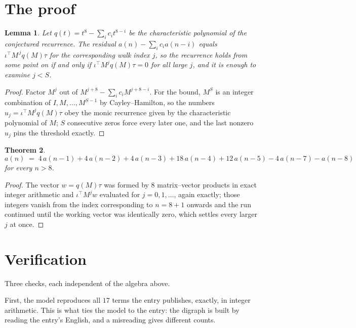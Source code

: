 \documentclass[11pt,a4paper]{article}
\theoremstyle{plain}
\newtheorem{theorem}{Theorem}
\newtheorem{lemma}[theorem]{Lemma}
\theoremstyle{definition}
\begin{document}
\section{The proof}

\begin{lemma}\label{lem:crit}
Let $q(t)=t^{8}-\sum_i c_it^{8-i}$ be the characteristic polynomial of the
conjectured recurrence. The residual $a(n)-\sum_ic_ia(n-i)$ equals
$\iota^{\!\top}M^{\,j}q(M)\tau$ for the corresponding walk index $j$, so the recurrence
holds from some point on if and only if $\iota^{\!\top}M^{j}q(M)\tau=0$ for all large $j$,
and it is enough to examine $j<S$.
\end{lemma}

\begin{proof}
Factor $M^{j}$ out of $M^{j+8}-\sum_ic_iM^{j+8-i}$. For the bound, $M^{S}$
is an integer combination of $I,M,\dots,M^{S-1}$ by Cayley--Hamilton, so the numbers
$u_j=\iota^{\!\top}M^{j}q(M)\tau$ obey the monic recurrence given by the characteristic
polynomial of $M$; $S$ consecutive zeros force every later one, and the last nonzero $u_j$
pins the threshold exactly.
\end{proof}

\begin{theorem}
\[
a(n)\;=\;4\,a(n-1) + 4\,a(n-2) + 4\,a(n-3) + 18\,a(n-4) + 12\,a(n-5) - 4\,a(n-7) - a(n-8)
\]
for every $n>8$.
\end{theorem}

\begin{proof}
The vector $w=q(M)\tau$ was formed by $8$ matrix--vector products in exact integer
arithmetic and $\iota^{\!\top}M^{j}w$ evaluated for $j=0,1,\dots$, again exactly; those
integers vanish from the index corresponding to $n=8+1$ onwards and the run continued
until the working vector was identically zero, which settles every larger $j$ at once.
\end{proof}

\section{Verification}

Three checks, each independent of the algebra above.

First, the model reproduces all $17$ terms the entry publishes, exactly, in integer
arithmetic. This is what ties the model to the entry: the digraph is built by reading the
entry's English, and a misreading gives different counts.
\end{document}
